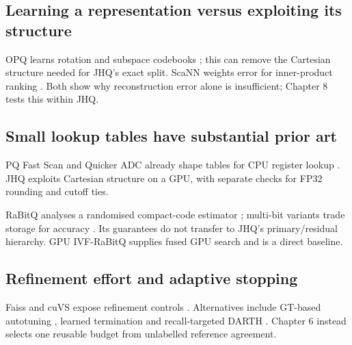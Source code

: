 \subsection{Learning a representation versus exploiting its structure}

OPQ learns rotation and subspace codebooks \cite{opq}; this can remove the Cartesian structure needed for JHQ's exact split. ScaNN weights error for inner-product ranking \cite{scann}. Both show why reconstruction error alone is insufficient; Chapter 8 tests this within JHQ.

\subsection{Small lookup tables have substantial prior art}

PQ Fast Scan and Quicker ADC already shape tables for CPU register lookup \cite{fastscan,quickeradc}. JHQ exploits Cartesian structure on a GPU, with separate checks for FP32 rounding and cutoff ties.

RaBitQ analyses a randomised compact-code estimator \cite{rabitq}; multi-bit variants trade storage for accuracy \cite{rabitq_multi}. Its guarantees do not transfer to JHQ's primary/residual hierarchy. GPU IVF-RaBitQ supplies fused GPU search \cite{ivfrabitq} and is a direct baseline.

\subsection{Refinement effort and adaptive stopping}

Faiss and cuVS expose refinement controls \cite{faiss_refine,cuvs_refinement}. Alternatives include GT-based autotuning \cite{faiss_autotune}, learned termination \cite{li_termination} and recall-targeted DARTH \cite{darth}. Chapter 6 instead selects one reusable budget from unlabelled reference agreement.